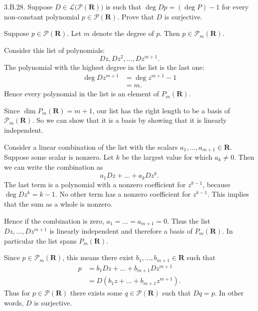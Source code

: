 \documentclass[a5paper]{article}
\begin{document}
\newcommand   \C           {\mathbf{C}}
\newcommand   \R           {\mathbf{R}}
\renewcommand \L           {\mathcal{L}}
\newcommand   \F           {\mathbf{F}}
\renewcommand \P           {\mathcal{P}}
\newcommand   \M           {\mathcal{M}}
\newcommand   \op          {\operatorname}

    3.B.28.
    Suppose $D \in \L\big(\P(\R)\big)$ is such that $\op{deg}Dp = (\op{deg}P) - 1$ for every non-constant polynomial $p \in \P(\R)$.
    Prove that $D$ is surjective.

    Suppose $p \in \P(\R)$.
    Let $m$ denote the degree of $p$.
    Then $p \in \P_m(\R)$.

    Consider this list of polynomials:
\begin{equation*}
        Dz, Dz^2, \dots, Dz^{m+1} .
\end{equation*}
    The polynomial with the highest degree in the list is the last one:
\begin{align*}
        \op{deg}Dz^{m+1}&=\op{deg}z^{m+1} - 1 \\
                          &=m .
\end{align*}
    Hence every polynomial in the list is an element of $P_m(\R)$.

    Since $\op{dim}P_m(\R) = m+1$, our list has the right length to be a basis of $\P_m(\R)$.
    So we can show that it is a basis by showing that it is linearly independent.

    Consider a linear combination of the list with the scalars $a_1,\dots,a_{m+1} \in \R$.
    Suppose some scalar is nonzero.
    Let $k$ be the largest value for which $a_k \neq 0$.
    Then we can write the combination as
\begin{equation*}
        a_1Dz + \dots + a_kDz^k .
\end{equation*}
    The last term is a polynomial with a nonzero coefficient for $z^{k-1}$, because $\op{deg}Dz^k = k-1$.
    No other term has a nonzero coefficient for $z^{k-1}$.
    This implies that the sum as a whole is nonzero.

    Hence if the combination is zero, $a_1=\dots=a_{m+1}=0$.
    Thus the list $Dz,\dots,Dz^{m+1}$ is linearly independent and therefore a basis of $P_m(\R)$.
    In particular the list spans $P_m(\R)$.

    Since $p \in \P_m(\R)$, this means there exist $b_1,\dots,b_{m+1}\in\R$ such that
\begin{align*}
        p &= b_1Dz + \dots + b_{m+1}Dz^{m+1} \\
          &= D(b_1z + \dots + b_{m+1}z^{m+1}) .
\end{align*}
    Thus for $p \in \P(\R)$ there exists some $q \in \P(\R)$ such that $Dq = p$.
    In other words, $D$ is surjective.
\end{document}
